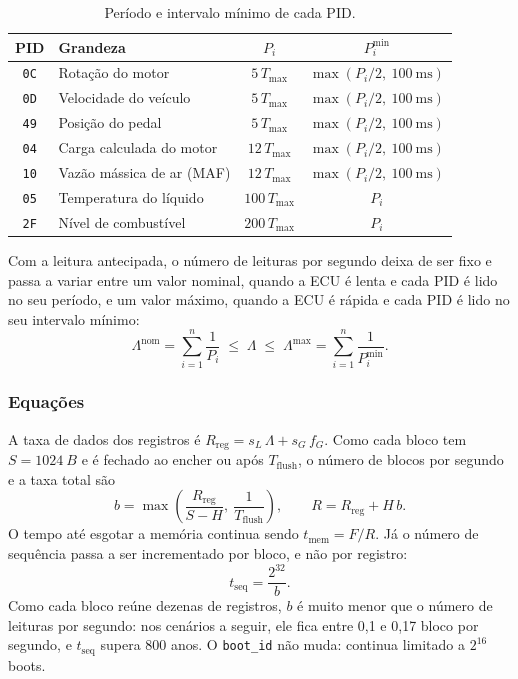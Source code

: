 \documentclass[12pt]{article}
\begin{document}
\begin{table}[htbp]
  \centering
  \caption{Período e intervalo mínimo de cada PID.}
  \label{tab:pmin}
  \begin{tabular}{clcc}
    \toprule
    PID & Grandeza & $P_i$ & $P_i^{\min}$ \\
    \midrule
    \texttt{0C} & Rotação do motor          & $5\,T_{\max}$   & $\max(P_i/2,\ \SI{100}{\milli\second})$ \\
    \texttt{0D} & Velocidade do veículo     & $5\,T_{\max}$   & $\max(P_i/2,\ \SI{100}{\milli\second})$ \\
    \texttt{49} & Posição do pedal          & $5\,T_{\max}$   & $\max(P_i/2,\ \SI{100}{\milli\second})$ \\
    \texttt{04} & Carga calculada do motor  & $12\,T_{\max}$  & $\max(P_i/2,\ \SI{100}{\milli\second})$ \\
    \texttt{10} & Vazão mássica de ar (MAF) & $12\,T_{\max}$  & $\max(P_i/2,\ \SI{100}{\milli\second})$ \\
    \texttt{05} & Temperatura do líquido    & $100\,T_{\max}$ & $P_i$ \\
    \texttt{2F} & Nível de combustível      & $200\,T_{\max}$ & $P_i$ \\
    \bottomrule
  \end{tabular}
\end{table}
 
Com a leitura antecipada, o número de leituras por segundo deixa de ser fixo e passa a variar entre um valor nominal, quando a ECU é lenta e cada PID é lido no seu período, e um valor máximo, quando a ECU é rápida e cada PID é lido no seu intervalo mínimo:
\begin{equation}
  \Lambda^{\mathrm{nom}} = \sum_{i=1}^{n} \frac{1}{P_i}
  \;\le\; \Lambda \;\le\;
  \Lambda^{\max} = \sum_{i=1}^{n} \frac{1}{P_i^{\min}} .
\end{equation}
 
\subsubsection{Equações}
 
A taxa de dados dos registros é $R_{\mathrm{reg}} = s_L\,\Lambda + s_G\,f_G$. Como cada bloco tem $S = \SI{1024}{B}$ e é fechado ao encher ou após $T_{\mathrm{flush}}$, o número de blocos por segundo e a taxa total são
\begin{equation}
  b = \max\!\left( \frac{R_{\mathrm{reg}}}{S - H},\ \frac{1}{T_{\mathrm{flush}}} \right),
  \qquad
  R = R_{\mathrm{reg}} + H\,b .
\end{equation}
O tempo até esgotar a memória continua sendo $t_{\mathrm{mem}} = F/R$. Já o número de sequência passa a ser incrementado por bloco, e não por registro:
\begin{equation}
  t_{\mathrm{seq}} = \frac{2^{32}}{b} .
\end{equation}
Como cada bloco reúne dezenas de registros, $b$ é muito menor que o número de leituras por segundo: nos cenários a seguir, ele fica entre 0{,}1 e 0{,}17 bloco por segundo, e $t_{\mathrm{seq}}$ supera 800 anos. O \texttt{boot\_id} não muda: continua limitado a $2^{16}$ boots.
 
\end{document}
